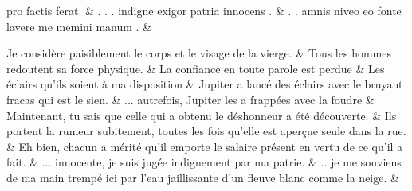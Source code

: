 \documentclass[12pt,onecolumn,twoside,a4paper]{memoir}
\begin{document}
\begin{pairs}
\begin{Leftside}
                              pro
                              factis
                              ferat. \&
                         \stanza {}
                     .
                              .
                              .
                              indigne
                              exigor
                              patria
                              innocens
                              . \&
                         \stanza {}
                     .
                              .
                              amnis
                              niveo
                              eo
                              fonte
                              lavere
                              me
                              memini
                              manum
                              . \&
                     
                  \endnumbering
		\end{Leftside}
                  \begin{Rightside}
			\beginnumbering
			\numberstanzafalse
                     
                         \stanza 
                     Je considère paisiblement le corps et le visage de la vierge. \&
                         \stanza 
                     Tous les hommes redoutent sa force physique. \&
                         \stanza 
                     La confiance en toute parole est perdue  \&
                         \stanza 
                     Les éclairs qu’ils soient à ma disposition \&
                         \stanza 
                     Jupiter a lancé des éclairs avec le bruyant fracas qui est le
                              sien. \&
                         \stanza 
                     ... autrefois, Jupiter les a frappées avec la foudre \&
                         \stanza 
                     Maintenant, tu sais que celle qui a obtenu le déshonneur a été
                              découverte. \&
                         \stanza 
                     Ils portent la rumeur subitement, toutes les fois qu’elle est aperçue
                              seule dans la rue. \&
                         \stanza 
                     Eh bien, chacun a mérité qu'il emporte le salaire présent en vertu de
                              ce qu'il a fait. \&
                         \stanza 
                     ... innocente, je suis jugée indignement par ma patrie. \&
                         \stanza 
                     .. je me souviens de ma main trempé ici par l'eau jaillissante d'un
                              fleuve blanc comme la neige. \&
                     
                  \endnumbering
		\end{Rightside}
               \end{pairs}
	\Columns
            
\end{document}
